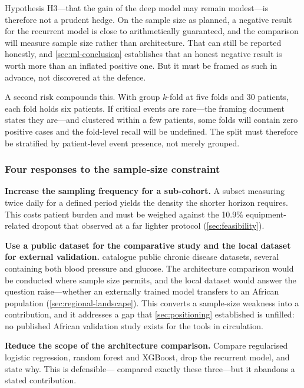 \documentclass[12pt,a4paper,oneside]{report}
\begin{document}
Hypothesis H3---that the gain of the deep model may remain modest---is therefore not a prudent hedge. On the sample size as planned, a negative result for the recurrent model is close to arithmetically guaranteed, and the comparison will measure sample size rather than architecture. That can still be reported honestly, and \cref{sec:ml-conclusion} establishes that an honest negative result is worth more than an inflated positive one. But it must be framed as such in advance, not discovered at the defence.

A second risk compounds this. With group $k$-fold at five folds and 30 patients, each fold holds six patients. If critical events are rare---the framing document states they are---and clustered within a few patients, some folds will contain zero positive cases and the fold-level recall will be undefined. The split must therefore be stratified by patient-level event presence, not merely grouped.

\subsubsection{Four responses to the sample-size constraint}

\textbf{Increase the sampling frequency for a sub-cohort.} A subset measuring twice daily for a defined period yields the density the shorter horizon requires. This costs patient burden and must be weighed against the 10.9\% equipment-related dropout that \textcite{mihevc2025} observed at a far lighter protocol (\cref{sec:feasibility}).

\textbf{Use a public dataset for the comparative study and the local dataset for external validation.} \Textcite{liu2025review} catalogue public chronic disease datasets, several containing both blood pressure and glucose. The architecture comparison would be conducted where sample size permits, and the local dataset would answer the question \textcite{segun2025} raise---whether an externally trained model transfers to an African population (\cref{sec:regional-landscape}). This converts a sample-size weakness into a contribution, and it addresses a gap that \cref{sec:positioning} established is unfilled: no published African validation study exists for the tools in circulation.

\textbf{Reduce the scope of the architecture comparison.} Compare regularised logistic regression, random forest and XGBoost, drop the recurrent model, and state why. This is defensible---\textcite{mendoza2025} compared exactly these three---but it abandons a stated contribution.
\end{document}
